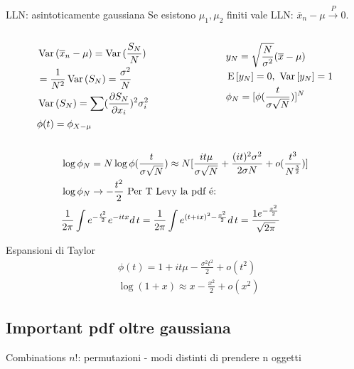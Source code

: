 \begin{frame}{LLN: asintoticamente gaussiana}
Se esistono $\mu_1, \mu_2$ finiti vale LLN: $\overline{x}_n-\mu\xrightarrow{P}0$.
\begin{columns}[T]
\begin{column}{0.5\textwidth}
\begin{align*}
&\var{(\overline{x}_n-\mu)}=\var{(\frac{S_N}{N})}\\
&=\frac{1}{N^2}\var{(S_N)}=\frac{\sigma^2}{N}\\
&\var{(S_N)}=\sum(\PDy{x_i}{S_N})^2\sigma_i^2\\
&\phi(t)=\phi_{X-\mu}
\end{align*}
\end{column}
\begin{column}{0.5\textwidth}
\begin{align*}
&y_N=\sqrt{\frac{N}{\sigma^2}}(\overline{x}-\mu)\\
&\E{[y_N]}=0,\ \var{[y_N]}=1\\
&\phi_N=[\phi(\frac{t}{\sigma\sqrt{N}})]^N
\end{align*}
\end{column}
\end{columns}
\begin{align*}
&\log{\phi_N}=N\log{\phi(\frac{t}{\sigma\sqrt{N}})}\approx N[\frac{it\mu}{\sigma\sqrt{N}}+\frac{(it)^2\sigma^2}{2\sigma N}+o(\frac{t^3}{N\expy{\frac{3}{2}}})]\\
&\log{\phi_N}\to-\frac{t^2}{2}\ \text{Per T Levy la pdf \'e:}\\
&\frac{1}{2\pi}\int\exp{-\frac{t^2}{2}}\exp{-itx}d\,t=\frac{1}{2\pi}\int\exp{(t+ix)^2-\frac{x^2}{2}}d\,t=\frac{1\exp{-\frac{x^2}{2}}}{\sqrt{2\pi}}
\end{align*}
\end{frame}

\begin{wordonframe}{Espansioni di Taylor}
\begin{align*}
&\phi(t)=1+it\mu-\frac{\sigma^2t^2}{2}+o(t^2)\\
&\log{(1+x)}\approx x-\frac{x^2}{2}+o(x^2)
\end{align*}
\end{wordonframe}

\subsection{Important pdf oltre gaussiana}

\begin{wordonframe}{Combinations}
$n!$: permutazioni - modi distinti di prendere n oggetti
\end{wordonframe}

